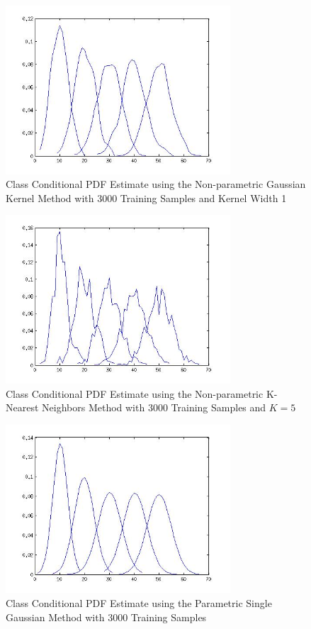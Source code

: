 \documentclass[journal]{IEEEtran}
\begin{document}
\begin{figure}
\centering
\includegraphics[width=3.3in]{../images/conditional_using_gausKernel_h1.jpg}
\caption{Class Conditional PDF Estimate using the Non-parametric Gaussian Kernel Method with 3000 Training Samples and Kernel Width 1}
\label{fig:3}
\end{figure}

\begin{figure}
\centering
\includegraphics[width=3.3in]{../images/conditional_using_knn_k5.jpg}
\caption{Class Conditional PDF Estimate using the Non-parametric K-Nearest Neighbors Method with 3000 Training Samples and \(K = 5\)}
\label{fig:4}
\end{figure}

\begin{figure}
\centering
\includegraphics[width=3.3in]{../images/conditional_using_singlegauss.jpg}
\caption{Class Conditional PDF Estimate using the Parametric Single Gaussian Method with 3000 Training Samples}
\label{fig:5}
\end{figure}
\end{document}
